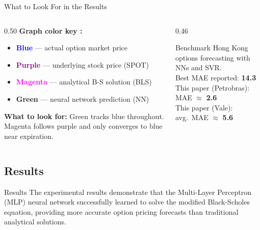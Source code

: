 \begin{frame}{What to Look For in the Results}
  \begin{columns}[T]
    \begin{column}{0.50\textwidth}
      \small
      \textbf{Graph color key \cite{santos2024}:}
      \begin{itemize}
        \item \textcolor{blue}{\textbf{Blue}} — actual option market price
        \item \textcolor{purple}{\textbf{Purple}} — underlying stock price (SPOT)
        \item \textcolor{magenta}{\textbf{Magenta}} — analytical B-S solution (BLS)
        \item \textcolor{nngreen}{\textbf{Green}} — neural network prediction (NN)
      \end{itemize}

      \vspace{0.25em}
      \textbf{What to look for:}
      Green tracks blue throughout. Magenta follows purple and only converges to blue near expiration.
    \end{column}
    \begin{column}{0.46\textwidth}
      \begin{exampleblock}{Benchmark \cite{liang2009}}
        Hong Kong options forecasting with NNs and SVR.\\[0.2em]
        Best MAE reported: \textbf{14.3}\\[0.2em]
        This paper (Petrobras): MAE $\approx$ \textbf{2.6}\\
        This paper (Vale): avg.\ MAE $\approx$ \textbf{5.6}
      \end{exampleblock}
    \end{column}
  \end{columns}
\end{frame}

\subsection{Results}
\begin{frame}{Results}
    The experimental results demonstrate that the Multi-Layer Perceptron (MLP) neural network
    successfully learned to solve the modified Black-Scholes equation, providing more accurate
    option pricing forecasts than traditional analytical solutions.
\end{frame}


